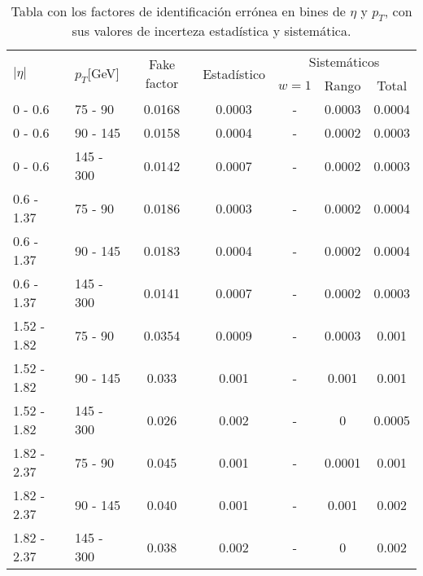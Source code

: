 \begin{table}	
\centering
\caption{Tabla con los factores de identificación errónea en bines de $\eta$ y $p_{T}$, con sus valores de incerteza estadística y sistemática.}
\begin{threeparttable}
\begin{tabular}{ l l c c c c c }

	\hline
	\hline

	\multirow{2}{*}{$|\eta|$} & \multirow{2}{*}{$p_{T}$[GeV]} & \multirow{2}{*}{Fake factor} & \multirow{2}{*}{Estadístico} & \multicolumn{3}{c}{Sistemáticos} \\
	
	\cline{5-7}

	 & & & & $w=1$ & Rango & Total \\

	\hline

	0 - 0.6 & 75 - 90 & 0.0168 & 0.0003 & -			& 0.0003  &  0.0004  \\

	0 - 0.6 & 90 - 145 & 0.0158 & 0.0004 & - 		& 0.0002  &  0.0003  \\

	0 - 0.6 & 145 - 300 & 0.0142 & 0.0007 & -  		& 0.0002  &  0.0003  \\

	\hline

	0.6 - 1.37 & 75 - 90 & 0.0186 & 0.0003 & -		& 0.0002  &  0.0004  \\

	0.6 - 1.37 & 90 - 145 & 0.0183 & 0.0004 & -		& 0.0002  &  0.0004  \\

	0.6 - 1.37 & 145 - 300 & 0.0141 & 0.0007 & -  	& 0.0002  &  0.0003  \\

	\hline

	1.52 - 1.82 & 75 - 90 & 0.0354  & 0.0009 & -		& 0.0003  &  0.001 \\

	1.52 - 1.82 & 90 - 145 & 0.033  & 0.001 & -		& 0.001  &  0.001 \\

	1.52 - 1.82 & 145 - 300 & 0.026  & 0.002 & -  	& 0  &  0.0005  \\

	\hline

	1.82 - 2.37 & 75 - 90 & 0.045  & 0.001 & -		& 0.0001  &  0.001 \\

	1.82 - 2.37 & 90 - 145 & 0.040  & 0.001 & -		& 0.001  &  0.002  \\

	1.82 - 2.37 & 145 - 300 & 0.038  & 0.002 & -  	& 0  &  0.002  \\

	\hline
	\hline

\end{tabular}
\end{threeparttable}
\label{ta:fftable}
\end{table}

